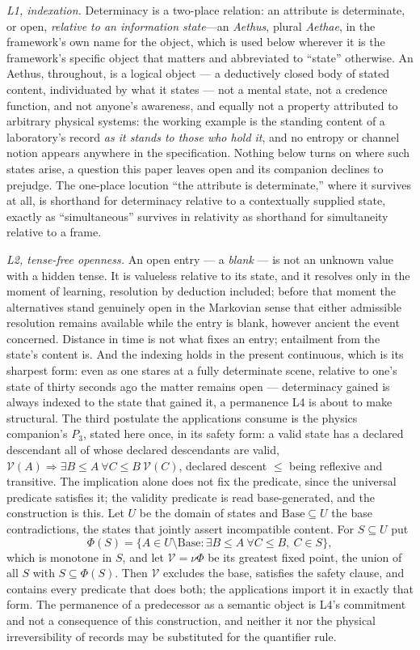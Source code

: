 \emph{L1, indexation.} Determinacy is a two-place relation: an attribute is determinate, or open, \emph{relative to an information state}---an \emph{Aethus}, plural \emph{Aethae}, in the framework's own name for the object, which is used below wherever it is the framework's specific object that matters and abbreviated to ``state'' otherwise. An Aethus, throughout, is a logical object --- a deductively closed body of stated content, individuated by what it states --- not a mental state, not a credence function, and not anyone's awareness, and equally not a property attributed to arbitrary physical systems: the working example is the standing content of a laboratory's record \emph{as it stands to those who hold it}, and no entropy or channel notion appears anywhere in the specification. Nothing below turns on where such states arise, a question this paper leaves open and its companion declines to prejudge. The one-place locution ``the attribute is determinate,'' where it survives at all, is shorthand for determinacy relative to a contextually supplied state, exactly as ``simultaneous'' survives in relativity as shorthand for simultaneity relative to a frame.

\emph{L2, tense-free openness.} An open entry --- a \emph{blank} --- is not an unknown value with a hidden tense. It is valueless relative to its state, and it resolves only in the moment of learning, resolution by deduction included; before that moment the alternatives stand genuinely open in the Markovian sense that either admissible resolution remains available while the entry is blank, however ancient the event concerned. Distance in time is not what fixes an entry; entailment from the state's content is. And the indexing holds in the present continuous, which is its sharpest form: even as one stares at a fully determinate scene, relative to one's state of thirty seconds ago the matter remains open --- determinacy gained is always indexed to the state that gained it, a permanence L4 is about to make structural. The third postulate the applications consume is the physics companion's $P_3$, stated here once, in its safety form: a valid state has a declared descendant all of whose declared descendants are valid, $\mathcal{V}(A) \Rightarrow \exists B \le A\ \forall C \le B\ \mathcal{V}(C)$, declared descent $\le$ being reflexive and transitive. The implication alone does not fix the predicate, since the universal predicate satisfies it; the validity predicate is read base-generated, and the construction is this. Let $U$ be the domain of states and $\mathrm{Base} \subseteq U$ the base contradictions, the states that jointly assert incompatible content. For $S \subseteq U$ put
\[
\Phi(S) = \{A \in U \setminus \mathrm{Base} : \exists B \le A\ \forall C \le B,\ C \in S\},
\]
which is monotone in $S$, and let $\mathcal{V} = \nu\Phi$ be its greatest fixed point, the union of all $S$ with $S \subseteq \Phi(S)$. Then $\mathcal{V}$ excludes the base, satisfies the safety clause, and contains every predicate that does both; the applications import it in exactly that form. The permanence of a predecessor as a semantic object is L4's commitment and not a consequence of this construction, and neither it nor the physical irreversibility of records may be substituted for the quantifier rule.

